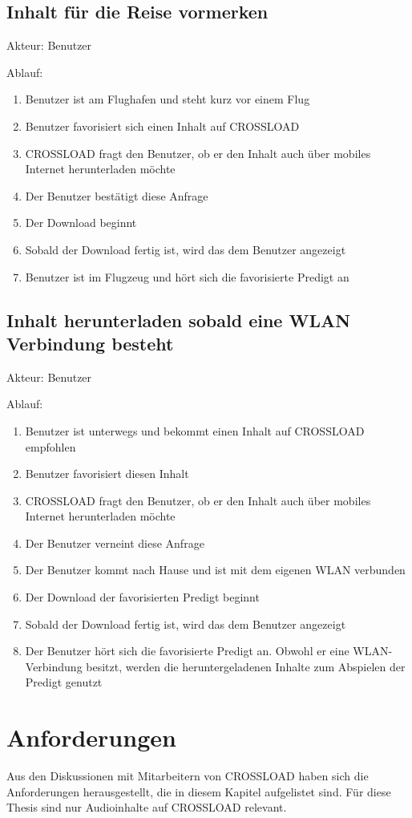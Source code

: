 \subsection{Inhalt für die Reise vormerken}
Akteur: Benutzer

Ablauf:
\begin{enumerate}
	\item Benutzer ist am Flughafen und steht kurz vor einem Flug
	\item Benutzer favorisiert sich einen Inhalt auf CROSSLOAD
	\item CROSSLOAD fragt den Benutzer, ob er den Inhalt auch über mobiles Internet herunterladen möchte
	\item Der Benutzer bestätigt diese Anfrage
	\item Der Download beginnt
	\item Sobald der Download fertig ist, wird das dem Benutzer angezeigt
	\item Benutzer ist im Flugzeug und hört sich die favorisierte Predigt an
\end{enumerate}

\subsection{Inhalt herunterladen sobald eine WLAN Verbindung besteht}
Akteur: Benutzer

Ablauf:
\begin{enumerate}
	\item Benutzer ist unterwegs und bekommt einen Inhalt auf CROSSLOAD empfohlen
	\item Benutzer favorisiert diesen Inhalt
	\item CROSSLOAD fragt den Benutzer, ob er den Inhalt auch über mobiles Internet herunterladen möchte
	\item Der Benutzer verneint diese Anfrage
	\item Der Benutzer kommt nach Hause und ist mit dem eigenen WLAN verbunden
	\item Der Download der favorisierten Predigt beginnt
	\item Sobald der Download fertig ist, wird das dem Benutzer angezeigt
	\item Der Benutzer hört sich die favorisierte Predigt an. Obwohl er eine WLAN-Verbindung besitzt, werden die heruntergeladenen Inhalte zum Abspielen der Predigt genutzt
\end{enumerate}

\section{Anforderungen}
\label{Kap3:Anforderungen}
Aus den Diskussionen mit Mitarbeitern von CROSSLOAD haben sich die Anforderungen herausgestellt, die in diesem Kapitel aufgelistet sind. Für diese Thesis sind nur Audioinhalte auf CROSSLOAD relevant. 

